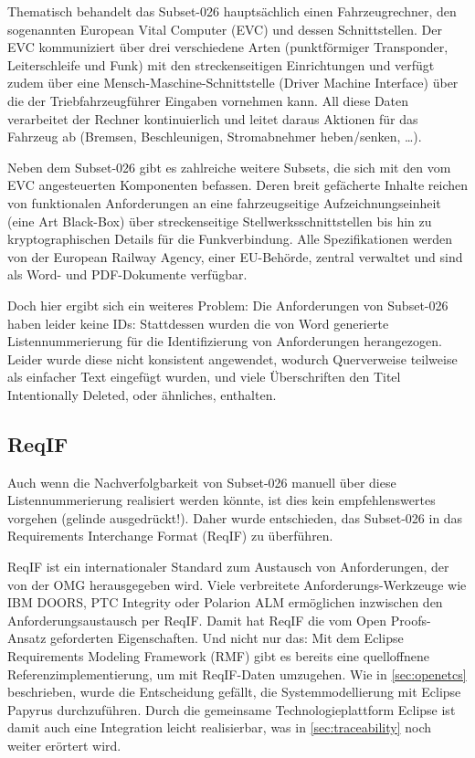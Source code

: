 \documentclass[twoside]{article}
\begin{document}
\begin{multicols}{2}
Thematisch behandelt das \glqq{}Subset-026\grqq{} hauptsächlich einen Fahrzeugrechner, den sogenannten European Vital Computer (EVC) und dessen Schnittstellen. Der EVC kommuniziert über drei verschiedene Arten (punktförmiger Transponder, Leiterschleife und Funk) mit den streckenseitigen Einrichtungen und verfügt zudem über eine Mensch-Maschine-Schnittstelle (Driver Machine Interface) über die der Triebfahrzeugführer Eingaben vornehmen kann. All diese Daten verarbeitet der Rechner kontinuierlich und leitet daraus Aktionen für das Fahrzeug ab (Bremsen, Beschleunigen, Stromabnehmer heben/senken, \ldots ).

Neben dem \glqq{}Subset-026\grqq{} gibt es zahlreiche weitere Subsets, die sich mit den vom EVC angesteuerten Komponenten befassen. Deren breit gefächerte Inhalte reichen von funktionalen Anforderungen an eine fahrzeugseitige Aufzeichnungseinheit (eine Art \glqq{}Black-Box\grqq{}) über streckenseitige Stellwerksschnittstellen bis hin zu kryptographischen Details für die Funkverbindung. Alle Spezifikationen werden von der European Railway Agency, einer EU-Behörde, zentral verwaltet und sind als Word- und PDF-Dokumente verfügbar.

Doch hier ergibt sich ein weiteres Problem: Die Anforderungen von Subset-026 haben leider keine IDs: Stattdessen wurden die von Word generierte Listennummerierung für die Identifizierung von Anforderungen herangezogen. Leider wurde diese nicht konsistent angewendet, wodurch Querverweise teilweise als einfacher Text eingefügt wurden, und viele Überschriften den Titel \glqq{}Intentionally Deleted\grqq{}, oder ähnliches, enthalten.

\subsection{ReqIF}

Auch wenn die Nachverfolgbarkeit von Subset-026 manuell über diese Listennummerierung realisiert werden könnte, ist dies kein empfehlenswertes vorgehen (gelinde ausgedrückt!).  Daher wurde entschieden, das Subset-026 in das Requirements Interchange Format (ReqIF) zu überführen. 

ReqIF \cite{openup} ist ein internationaler Standard zum Austausch von Anforderungen, der von der OMG herausgegeben wird.  Viele verbreitete Anforderungs-Werkzeuge wie IBM DOORS, PTC Integrity oder Polarion ALM ermöglichen inzwischen den Anforderungsaustausch per ReqIF.  Damit hat ReqIF die vom Open Proofs-Ansatz geforderten Eigenschaften.  Und nicht nur das: Mit dem Eclipse Requirements Modeling Framework (RMF) gibt es bereits eine quelloffnene Referenzimplementierung, um mit ReqIF-Daten umzugehen. Wie in \ref{sec:openetcs} beschrieben, wurde die Entscheidung gefällt, die Systemmodellierung mit Eclipse Papyrus durchzuführen.  Durch die gemeinsame Technologieplattform Eclipse ist damit auch eine Integration leicht realisierbar, was in \ref{sec:traceability} noch weiter erörtert wird.


\end{multicols}
\end{document}
